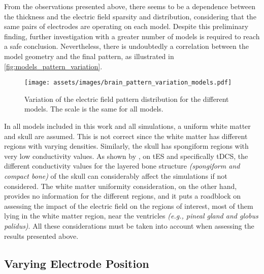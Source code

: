 From the observations presented above, there seems to be a dependence between the thickness and the electric field sparsity and distribution, considering that the same pairs of electrodes are operating on each model. Despite this preliminary finding, further investigation with a greater number of models is required to reach a safe conclusion. Nevertheless, there is undoubtedly a correlation between the model geometry and the final pattern, as illustrated in \autoref{fig:models_pattern_variation}.
\begin{figure}[H]
    \centering
    \texttt{[image: assets/images/brain\_pattern\_variation\_models.pdf]}
    \caption{Variation of the electric field pattern distribution for the different models. The scale is the same for all models.}
    \label{fig:models_pattern_variation}
\end{figure}
In all models included in this work and all simulations, a uniform white matter and skull are assumed. This is not correct since the white matter has different regions with varying densities. Similarly, the skull has spongiform regions with very low conductivity values. As shown by , on \gls{tES} and specifically \gls{tDCS}, the different conductivity values for the layered bone structure \textit{(spongiform and compact bone)} of the skull can considerably affect the simulations if not considered. The white matter uniformity consideration, on the other hand, provides no information for the different regions, and it puts a roadblock on assessing the impact of the electric field on the regions of interest, most of them lying in the white matter region, near the ventricles \textit{(e.g., pineal gland and globus palidus)}. All these considerations must be taken into account when assessing the results presented above.

\subsection{Varying Electrode Position}
\label{subsec:varying_electrode_position}

